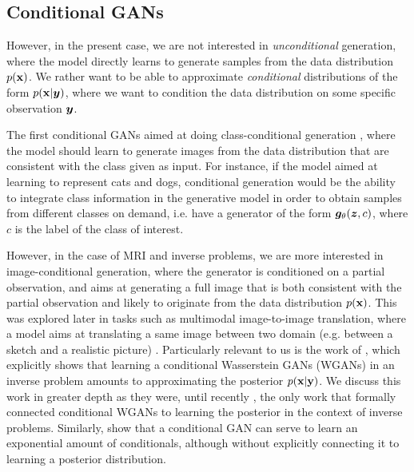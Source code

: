 \subsection{Conditional GANs}
However, in the present case, we are not interested in \textit{unconditional} generation, where the model directly learns to generate samples from the data distribution $p({\mathbf{x}})$. We rather want to be able to approximate \textit{conditional} distributions of the form $p({\mathbf{x}}|{\bm{y}})$, where we want to condition the data distribution on some specific observation ${\bm{y}}$. 

The first conditional GANs aimed at doing class-conditional generation \citep{mirza2014conditional}, where the model should learn to generate images from the data distribution that are consistent with the class given as input. For instance, if the model aimed at learning to represent cats and dogs, conditional generation would be the ability to integrate class information in the generative model in order to obtain samples from different classes on demand, i.e. have a generator of the form ${\bm{g}}_\theta({\bm{z}}, c)$, where $c$ is the label of the class of interest. 

However, in the case of MRI and inverse problems, we are more interested in image-conditional generation, where the generator is conditioned on a partial observation, and aims at generating a full image that is both consistent with the partial observation and likely to originate from the data distribution $p({\mathbf{x}})$. This was explored later in tasks such as multimodal image-to-image translation, where a model aims at translating a same image between two domain (e.g. between a sketch and a realistic picture) \citep{zhu2017multimodal}. Particularly relevant to us is the work of \citet{adler2018deep}, which explicitly shows that learning a conditional Wasserstein GANs (WGANs) \citep{arjovsky2017wasserstein} in an inverse problem amounts to approximating the posterior $p({\mathbf{x}}|{\mathbf{y}})$. We discuss this work in greater depth as they were, until recently \citep{kovachki2020conditional}, the only work that formally connected conditional WGANs to learning the posterior in the context of inverse problems. 
Similarly, \citep{belghazi2019learning} show that a conditional GAN can serve to learn an exponential amount of conditionals, although without explicitly connecting it to learning a posterior distribution.

